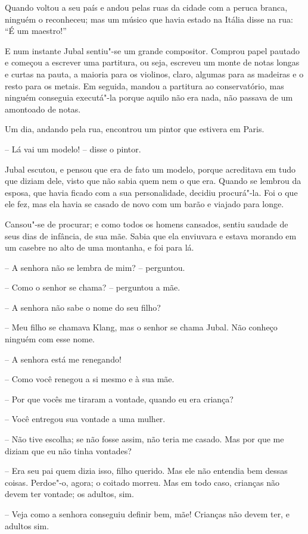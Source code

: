 Quando voltou a seu país e andou pelas ruas da cidade com a peruca
branca, ninguém o reconheceu; mas um músico que havia estado na Itália
disse na rua: ``É um maestro!''

E num instante Jubal sentiu"-se um grande compositor. Comprou papel
pautado e começou a escrever uma partitura, ou seja, escreveu um monte
de notas longas e curtas na pauta, a maioria para os violinos, claro,
algumas para as madeiras e o resto para os metais. Em seguida, mandou a
partitura ao conservatório, mas ninguém conseguia executá"-la porque
aquilo não era nada, não passava de um amontoado de notas.

Um dia, andando pela rua, encontrou um pintor que estivera em Paris. 

-- Lá vai um modelo! -- disse o pintor.

Jubal escutou, e pensou que era de fato um modelo, porque acreditava em
tudo que diziam dele, visto que não sabia quem nem o que era.
Quando se lembrou da esposa, que havia ficado com a sua personalidade,
decidiu procurá"-la. Foi o que ele fez, mas ela havia se casado de
novo com um barão e viajado para longe.

Cansou"-se de procurar; e como todos os homens cansados, sentiu saudade
de seus dias de infância, de sua mãe. Sabia que ela enviuvara e estava
morando em um casebre no alto de uma montanha, e foi para lá.

-- A senhora não se lembra de mim? -- perguntou.

-- Como o senhor se chama? -- perguntou a mãe.

-- A senhora não sabe o nome do seu filho?

-- Meu filho se chamava Klang, mas o senhor se chama Jubal. Não conheço
ninguém com esse nome.

-- A senhora está me renegando!

-- Como você renegou a si mesmo e à sua mãe.

-- Por que vocês me tiraram a vontade, quando eu era criança?

-- Você entregou sua vontade a uma mulher.

-- Não tive escolha; se não fosse assim, não teria me casado. Mas por que
me diziam que eu não tinha vontades?

-- Era seu pai quem dizia isso, filho querido. Mas ele não entendia bem
dessas coisas. Perdoe"-o, agora; o coitado morreu. Mas em todo caso,
crianças não devem ter vontade; os adultos, sim.

-- Veja como a senhora conseguiu definir bem, mãe! Crianças não devem
ter, e adultos sim.

